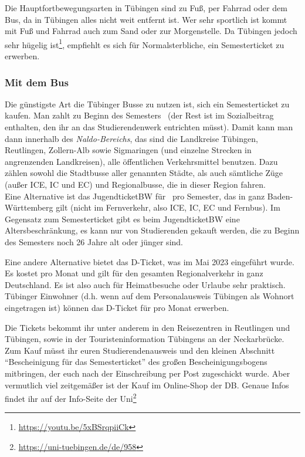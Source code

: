 Die Hauptfortbewegungsarten in Tübingen sind zu Fuß, per Fahrrad oder dem Bus, da in Tübingen alles nicht weit entfernt ist. Wer sehr sportlich ist kommt mit Fuß und Fahrrad auch zum Sand oder zur Morgenstelle. Da Tübingen jedoch sehr hügelig ist\footnote{\url{https://youtu.be/5xBSrqpiiCk}}, empfiehlt es sich für Normalsterbliche, ein Semesterticket zu erwerben.	%
\vfill \pagebreak
\subsubsection*{Mit dem Bus}
Die günstigste Art die Tübinger Busse zu nutzen ist, sich ein Semesterticket zu kaufen. Man zahlt zu Beginn des
Semesters \semesterticketpreis \ (der Rest ist im Sozialbeitrag enthalten, den ihr an das Studierendenwerk entrichten müsst).
Damit kann man dann innerhalb des \emph{Naldo-Bereichs}, das sind die Landkreise Tübingen, Reutlingen, Zollern-Alb
sowie Sigmaringen (und einzelne Strecken in angrenzenden Landkreisen), alle öffentlichen Verkehrsmittel benutzen.
Dazu zählen sowohl die Stadtbusse aller genannten Städte, als auch sämtliche Züge (außer ICE, IC und EC) und Regionalbusse,
die in dieser Region fahren. \\
Eine Alternative ist das JugendticketBW für \jugendticketbwpreis \ pro Semester,
das in ganz Baden-Württemberg gilt (nicht im Fernverkehr, also ICE, IC, EC und Fernbus).
Im Gegensatz zum Semesterticket gibt es beim JugendticketBW eine Altersbeschränkung,
es kann nur von Studierenden gekauft werden, die zu Beginn des Semesters noch 26 Jahre alt oder jünger sind.

Eine andere Alternative bietet das D-Ticket, was im Mai 2023 eingeführt wurde. Es kostet \dticketpreis pro Monat und gilt für den
gesamten Regionalverkehr in ganz Deutschland. Es ist also auch für Heimatbesuche oder Urlaube sehr praktisch. Tübinger Einwohner
(d.h. wenn auf dem Personalausweis Tübingen als Wohnort eingetragen ist) können das D-Ticket für \dtickettuebingenpreis pro Monat erwerben.

Die Tickets bekommt ihr unter anderem in den Reisezentren in Reutlingen und Tübingen, sowie in der Touristeninformation
Tübingens an der Neckarbrücke. Zum Kauf müsst ihr euren Studierendenausweis und den kleinen Abschnitt "`Bescheinigung für
das Semesterticket"' des großen Bescheinigungsbogens mitbringen, der euch nach der Einschreibung per Post zugeschickt
wurde. Aber vermutlich viel zeitgemäßer ist der Kauf im Online-Shop der DB. Genaue Infos findet ihr auf der Info-Seite
der Uni\footnote{\url{https://uni-tuebingen.de/de/958}}


